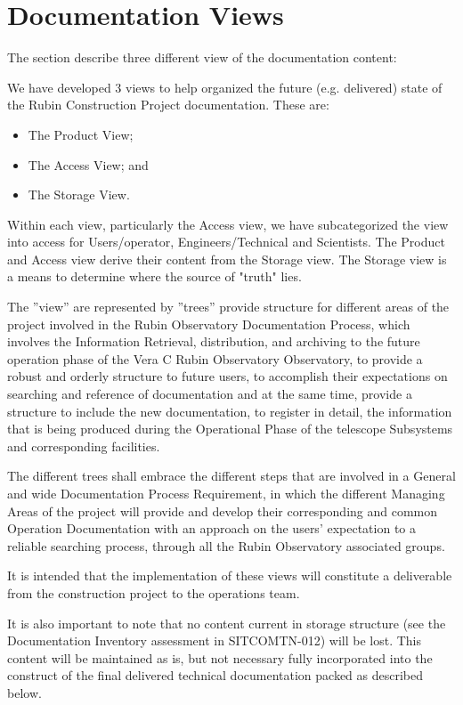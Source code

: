 \section{Documentation Views}
\label{sec:views}

The section describe three different view of the documentation content:

We have developed 3 views to help organized the future (e.g. delivered) state of the Rubin Construction Project documentation.  These are:

\begin{itemize}

\item The Product View;
\item The Access View; and
\item The Storage View.

\end{itemize}
 
Within each view, particularly the Access view, we have subcategorized the view into access for Users/operator, Engineers/Technical and Scientists.  The Product and Access view derive their content from the Storage view.  The Storage view is a means to determine where the source of "truth" lies.

The ''view'' are represented by ''trees'' provide structure for different areas of the project involved in the Rubin Observatory Documentation Process, which involves the Information Retrieval, distribution, and archiving to the future operation phase of the Vera C Rubin Observatory  Observatory, to provide a robust and orderly structure to future users,  to accomplish their expectations on searching and reference of documentation and at the same time, provide a structure to include the new documentation, to register in detail, the information that is being produced during the Operational Phase of the telescope Subsystems and corresponding facilities.

The different trees shall embrace the different steps that are involved in a General and wide Documentation Process Requirement, in which the different Managing Areas of the project will provide and develop their corresponding and common Operation Documentation with an approach on the users' expectation to a reliable searching process, through all the Rubin Observatory associated groups.

It is intended that the implementation of these views will constitute a deliverable from the construction project to the operations team.

It is also important to note that no content current in storage structure (see the Documentation Inventory assessment in SITCOMTN-012) will be lost.  This content will be maintained as is, but not necessary fully incorporated into the construct of the final delivered technical documentation packed as described below.

